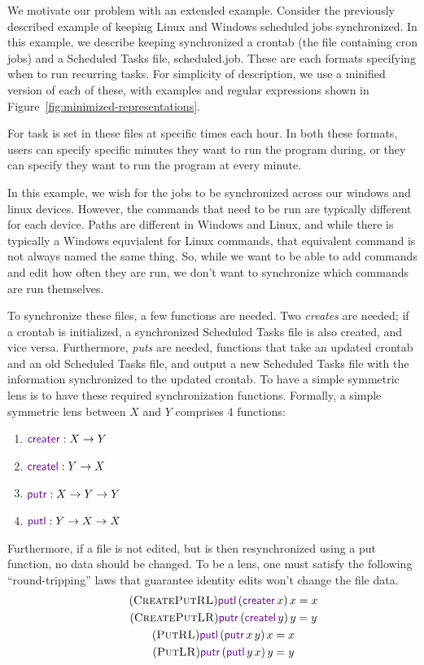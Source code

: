 \documentclass[acmsmall,screen,anonymous]{acmart}
\begin{document}
We motivate our problem with an extended example. Consider the previously
described example of keeping Linux and Windows scheduled jobs synchronized. In
this example, we describe keeping synchronized a crontab (the file containing
cron jobs) and a Scheduled Tasks file, scheduled.job. These are each formats
specifying when to run recurring tasks. For simplicity of description, we use a
minified version of each of these, with examples and regular expressions shown
in Figure~\ref{fig:minimized-representations}.

For task is set in these files at specific times each hour. In both these
formats, users can specify specific minutes they want to run the program during,
or they can specify they want to run the program at every minute.

In this example, we wish for the jobs to be synchronized across our windows and
linux devices. However, the commands that need to be run are typically different
for each device. Paths are different in Windows and Linux, and while there is
typically a Windows equvialent for Linux commands, that equivalent command is
not always named the same thing.  So, while we want to be able to add commands
and edit how often they are run, we don't want to synchronize which commands are
run themselves.

To synchronize these files, a few functions are needed. Two \emph{creates} are
needed; if a crontab is initialized, a synchronized Scheduled Tasks file is also
created, and vice versa. Furthermore, \emph{puts} are needed, functions that
take an updated crontab and an old Scheduled Tasks file, and output a new
Scheduled Tasks file with the information synchronized to the updated crontab.
To have a simple symmetric lens is to have these required synchronization
functions. Formally, a simple symmetric lens between $X$ and $Y$ comprises 4
functions:
\begin{enumerate}
\item $\CreateR \OfType X \rightarrow Y$
\item $\CreateL \OfType Y \rightarrow X$
\item $\PutR \OfType X \rightarrow Y \rightarrow Y$
\item $\PutL \OfType Y \rightarrow X \rightarrow X$
\end{enumerate}
Furthermore, if a file is not edited, but is then resynchronized using a put
function, no data should be changed. To be a lens, one must satisfy the
following ``round-tripping'' laws that guarantee identity edits won't change the
file data.
\begin{gather}
  \tag{\CreatePutRL}
  \PutLOf{(\CreateROf{x})}{x} = x\\
  \tag{\CreatePutLR}
  \PutROf{(\CreateLOf{y})}{y} = y\\
  \tag{\PutRL}
  \PutLOf{(\PutROf{x}{y})}{x} = x\\
  \tag{\PutLR}
  \PutROf{(\PutLOf{y}{x})}{y} = y
\end{gather}
\end{document}
